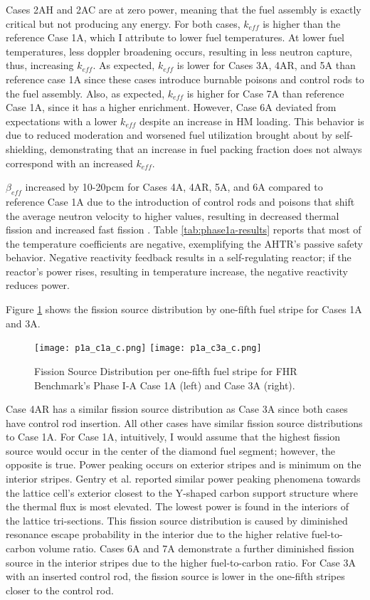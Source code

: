Cases 2AH and 2AC are at zero power, meaning that the fuel assembly is exactly 
critical but not producing any energy. 
For both cases, $k_{eff}$ is higher than the reference Case 1A, which I attribute to 
lower fuel temperatures. 
At lower fuel temperatures, less doppler broadening occurs, 
resulting in less neutron capture, thus, increasing $k_{eff}$. 
As expected, $k_{eff}$ is lower for Cases 3A, 4AR, and 5A than reference case 
1A since these cases introduce burnable poisons and control rods to the fuel 
assembly. 
Also, as expected, $k_{eff}$ is higher for Case 7A than reference Case 1A, since 
it has a higher enrichment. 
However, Case 6A deviated from expectations with a lower $k_{eff}$ despite an increase 
in \acrlong{HM} loading. 
This behavior is due to reduced moderation and worsened fuel 
utilization brought about by self-shielding, demonstrating that an increase in 
fuel packing fraction does not always correspond with an increased $k_{eff}$. 

$\beta_{eff}$ increased by 10-20pcm for Cases 4A, 4AR, 5A, and 6A compared to
reference Case 1A due to the introduction of control rods and poisons that 
shift the average neutron velocity to higher values, resulting in decreased
thermal fission and increased fast fission \cite{torabi_neutronic_2018}.
Table \ref{tab:phase1a-results} reports that most of the temperature coefficients 
are negative, exemplifying the \gls{AHTR}'s passive safety behavior. 
Negative reactivity feedback results in a self-regulating reactor; if the reactor's 
power rises, resulting in temperature increase, the negative reactivity
reduces power. 

Figure \ref{fig:phase1a-c} shows the fission source distribution by 
one-fifth fuel stripe for Cases 1A and 3A. 
\begin{figure}[]
    \centering
    \texttt{[image: p1a\_c1a\_c.png]} 
    \texttt{[image: p1a\_c3a\_c.png]} 
    \caption{Fission Source Distribution per one-fifth fuel stripe for \acrlong{FHR} 
    Benchmark's Phase I-A Case 1A (left) and Case 3A (right).}
    \label{fig:phase1a-c}
\end{figure}
Case 4AR has a similar fission source distribution as Case 3A since both 
cases have control rod insertion. 
All other cases have similar fission source distributions to Case 1A. 
For Case 1A, intuitively, I would assume that the highest fission source would 
occur in the center of the diamond fuel segment; however, the opposite is true. 
Power peaking occurs on exterior stripes and is minimum on the interior stripes.
Gentry et al. \cite{gentry_development_2016} reported similar power peaking 
phenomena towards the lattice cell's exterior closest to the Y-shaped carbon 
support structure where the thermal flux is most elevated. 
The lowest power is found in the interiors of the lattice tri-sections. 
This fission source distribution is caused by diminished resonance escape 
probability in the interior due to the higher relative fuel-to-carbon volume 
ratio. 
Cases 6A and 7A demonstrate a further diminished fission source in the interior 
stripes due to the higher fuel-to-carbon ratio.
For Case 3A with an inserted control rod, the fission source is lower in 
the one-fifth stripes closer to the control rod.  


